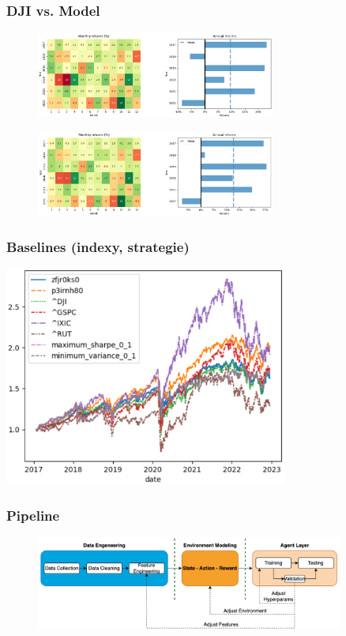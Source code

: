 \begin{frame}
    \frametitle{DJI vs. Model}
    \begin{figure}
        \centering
        \includegraphics[width=0.7\textwidth]{img/dji-month-year}
    \end{figure}
    \begin{figure}
        \centering
        \includegraphics[width=0.7\textwidth]{img/model-month-year}
    \end{figure}
\end{frame}

\begin{frame}
    \frametitle{Baselines (indexy, strategie)}
    \begin{center}
        \centering
        \includegraphics[width=0.7\textwidth]{img/returns}
    \end{center}
\end{frame}

\begin{frame}
    \frametitle{Pipeline}
    \begin{center}
        \begin{figure}
            \centering
            \includegraphics[width=0.9\textwidth]{img/navrh_reseni}
        \end{figure}
    \end{center}
\end{frame}

